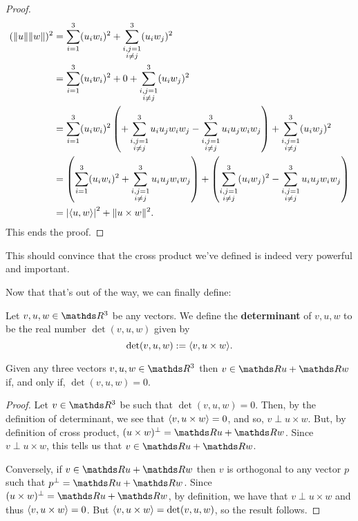\begin{proof}
	\begin{align*}
	(\lVert u\rVert\lVert w\rVert)^2&=\sum_{i=1}^3(u_iw_i)^2+\sum_{\substack{i,j=1\\i\neq j
	}}^3(u_iw_j)^2\\
	&=\sum_{i=1}^3(u_iw_i)^2+0+\sum_{\substack{i,j=1\\i\neq j
	}}^3(u_iw_j)^2\\
	&=\sum_{i=1}^3(u_iw_i)^2\left(+\sum_{\substack{i,j=1\\i\neq j}}^3u_iu_jw_iw_j-\sum_{\substack{i,j=1\\i\neq j}}^3u_iu_jw_iw_j\right)+\sum_{\substack{i,j=1\\i\neq j
	}}^3(u_iw_j)^2\\
	&=\left(\sum_{i=1}^3(u_iw_i)^2+\sum_{\substack{i,j=1\\i\neq j}}^3u_iu_jw_iw_j\right)+\left(\sum_{\substack{i,j=1\\i\neq j
	}}^3(u_iw_j)^2-\sum_{\substack{i,j=1\\i\neq j}}^3u_iu_jw_iw_j\right)\\&=\left\vert\langle u,w\rangle\right\vert^2+\lVert u\times w\rVert^2.
	\end{align*}This ends the proof.
\end{proof}

This should convince that the cross product we've defined is indeed very powerful and important.

Now that that's out of the way, we can finally define:

\begin{df}
	Let $v,u,w\in \R^3$ be any vectors. We define the \textbf{determinant} of $v,u,w$ to be the real number $\det(v,u,w)$ given by
	\[\det(v,u,w):=\langle v,u\times w\rangle.\]
\end{df}

\begin{lemma}
	Given any three vectors $v,u,w\in \R^3$ then $v\in\R u+\R w$ if, and only if, $\det(v,u,w)=0$.
\end{lemma}
\begin{proof}
	Let $v\in \R^3$ be such that $\det(v,u,w)=0$. Then, by the definition of determinant, we see that $\langle v,u\times w\rangle=0$, and so, $v\perp u\times w$. But, by definition of cross product, $(u\times w)^\perp=\R u+\R w$. Since $v\perp u\times w$, this tells us that $v\in \R u+\R w$.
	
	Conversely, if $v\in \R u+\R w$ then $v$ is orthogonal to any vector $p$ such that $p^\perp=\R u+\R w$. Since $(u\times w)^\perp=\R u+\R w$, by definition, we have that $v\perp u\times w$ and thus $\langle v,u\times w\rangle=0$. But $\langle v,u\times w\rangle=\det(v,u,w)$, so the result follows.
\end{proof}

